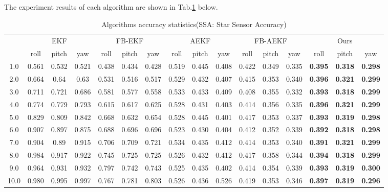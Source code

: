 \documentclass{article}
\begin{document}
	The experiment results of each algorithm are shown in Tab.\ref{tab:expresult} below.
	\begin{table}[htbp]\small
		\centering
		\caption{Algorithms accuracy statistics(SSA: Star Sensor Accuracy)}
		\begin{tabular}{cccccccccccccccc}
			\toprule
			\multicolumn{1}{c}{\multirow{2}[1]{*}{\makecell[c]{SSA}}} & \multicolumn{3}{c}{EKF} & \multicolumn{3}{c}{FB-EKF} & \multicolumn{3}{c}{AEKF} & \multicolumn{3}{c}{FB-AEKF} & \multicolumn{3}{c}{Ours} \\
			\cmidrule{2-16} & \multicolumn{1}{p{2em}}{roll} & \multicolumn{1}{p{2em}}{pitch} & \multicolumn{1}{p{2em}}{yaw} & \multicolumn{1}{p{1em}}{roll} & \multicolumn{1}{p{1em}}{pitch} & \multicolumn{1}{p{1em}}{yaw} & \multicolumn{1}{p{1em}}{roll} & \multicolumn{1}{p{1em}}{pitch} & \multicolumn{1}{p{1em}}{yaw} & \multicolumn{1}{p{1em}}{roll} & \multicolumn{1}{p{1em}}{pitch} & \multicolumn{1}{p{1em}}{yaw} & \multicolumn{1}{p{1em}}{roll} & \multicolumn{1}{p{1em}}{pitch} & \multicolumn{1}{p{1em}}{yaw} \\
			\midrule
			1.0   & 0.561 & 0.532 & 0.521 & 0.438 & 0.434 & 0.428 & 0.519 & 0.445 & 0.408 & 0.422 & 0.349 & 0.335 & \textbf{0.395} & \textbf{0.318} & \textbf{0.298} \\
			2.0   & 0.664 & 0.64  & 0.63  & 0.531 & 0.516 & 0.517 & 0.529 & 0.432 & 0.407 & 0.415 & 0.353 & 0.340 & \textbf{0.396} & \textbf{0.321} & \textbf{0.299} \\
			3.0   & 0.711 & 0.721 & 0.686 & 0.581 & 0.577 & 0.558 & 0.533 & 0.433 & 0.409 & 0.408 & 0.355 & 0.332 & \textbf{0.393} & \textbf{0.318} & \textbf{0.299} \\
			4.0   & 0.774 & 0.779 & 0.793 & 0.615 & 0.617 & 0.625 & 0.528 & 0.431 & 0.403 & 0.414 & 0.356 & 0.335 & \textbf{0.396} & \textbf{0.321} & \textbf{0.299} \\
			5.0   & 0.829 & 0.809 & 0.842 & 0.668 & 0.632 & 0.654 & 0.528 & 0.445 & 0.401 & 0.417 & 0.353 & 0.337 & \textbf{0.393} & \textbf{0.319} & \textbf{0.298} \\
			6.0   & 0.907 & 0.897 & 0.875 & 0.688 & 0.696 & 0.696 & 0.523 & 0.430 & 0.404 & 0.412 & 0.352 & 0.339 & \textbf{0.392} & \textbf{0.318} & \textbf{0.298} \\
			7.0   & 0.904 & 0.89  & 0.915 & 0.706 & 0.709 & 0.721 & 0.534 & 0.435 & 0.412 & 0.414 & 0.353 & 0.340 & \textbf{0.391} & \textbf{0.321} & \textbf{0.299} \\
			8.0   & 0.984 & 0.917 & 0.922 & 0.745 & 0.725 & 0.725 & 0.526 & 0.432 & 0.412 & 0.417 & 0.358 & 0.344 & \textbf{0.394} & \textbf{0.318} & \textbf{0.299} \\
			9.0   & 0.964 & 0.931 & 0.932 & 0.797 & 0.742 & 0.743 & 0.525 & 0.435 & 0.402 & 0.414 & 0.354 & 0.339 & \textbf{0.393} & \textbf{0.319} & \textbf{0.300} \\
			10.0  & 0.980 & 0.995 & 0.997 & 0.767 & 0.781 & 0.803 & 0.526 & 0.436 & 0.526 & 0.419 & 0.353 & 0.346 & \textbf{0.397} & \textbf{0.319} & \textbf{0.296} \\
			\bottomrule
		\end{tabular}%
		\label{tab:expresult}%
	\end{table}%
	
\end{document}
